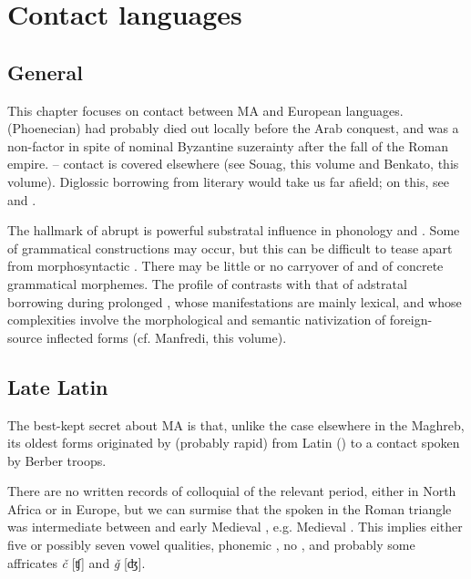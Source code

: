 \documentclass[output=paper]{langsci/langscibook}
\begin{document}
\section{Contact languages}

\subsection{General}

This chapter focuses on contact between MA and European languages.  (Phoenecian) had probably died out locally before the Arab conquest, and  was a non-factor in spite of nominal Byzantine suzerainty after the fall of the Roman empire. – contact is covered elsewhere (see Souag, this volume and Benkato, this volume). Diglossic borrowing from literary  would take us far afield; on this, see \citet{Sayahi2014} and \citet{Heath1989}.

The hallmark of abrupt  is powerful substratal influence in phonology and . Some  of grammatical constructions may occur, but this can be difficult to tease apart from morphosyntactic . There may be little or no carryover of  and of concrete grammatical morphemes. The profile of  contrasts with that of adstratal borrowing during prolonged , whose manifestations are mainly lexical, and whose complexities involve the morphological and semantic nativization of foreign-source inflected forms (cf. Manfredi, this volume).

\subsection{Late Latin}

The best-kept secret about MA is that, unlike the case elsewhere in the Maghreb, its oldest forms originated by  (probably rapid) from  Latin () to a contact  spoken by Berber troops.

There are no written records of colloquial  of the relevant period, either in North Africa or in Europe, but we can surmise that the  spoken in the Roman triangle was intermediate between  and early Medieval , e.g. Medieval . This implies either five or possibly seven vowel qualities, phonemic , no , and probably some affricates \textit{č} [ʧ] and \textit{ǧ} [ʤ].
\end{document}
